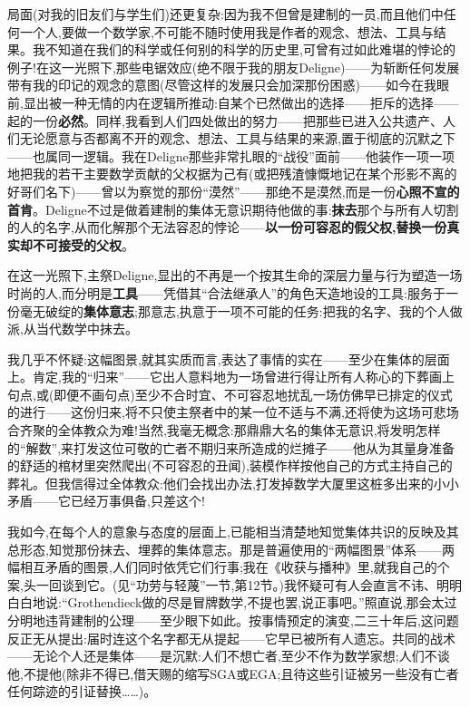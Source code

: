 \dmark{}局面(对我的旧友们与学生们)还更复杂:因为我不但曾是建制的一员,而且他们中任何一个人,要做一个数学家,不可能不随时使用我是作者的观念、想法、工具与结果。我不知道在我们的科学或任何别的科学的历史里,可曾有过如此难堪的悖论的例子!在这一光照下,那些电锯效应(绝不限于我的朋友Deligne)——为斩断任何发展带有我的印记的观念的意图(尽管这样的发展只会加深那份困惑)——如今在我眼前,显出被一种无情的内在逻辑所推动:自某个已然做出的选择——拒斥的选择——起的一份\textbf{必然}。同样,我看到人们四处做出的努力——把那些已进入公共遗产、人们无论愿意与否都离不开的观念、想法、工具与结果的来源,置于彻底的沉默之下——也属同一逻辑。我在Deligne那些非常扎眼的“战役”面前——他装作一项一项地把我的若干主要数学贡献的父权据为己有(或把残渣慷慨地记在某个形影不离的好哥们名下)——曾以为察觉的那份“漠然”——那绝不是漠然,而是一份\textbf{心照不宣的首肯}。Deligne不过是做着建制的集体无意识期待他做的事:\textbf{抹去}那个与所有人切割的人的名字,从而化解那个无法容忍的悖论——\textbf{以一份可容忍的假父权,替换一份真实却不可接受的父权}。

在这一光照下,主祭Deligne,显出的不再是一个按其生命的深层力量与行为塑造一场时尚的人,而分明是\textbf{工具}——凭借其“合法继承人”的角色天造地设的工具:服务于一份毫无破绽的\textbf{集体意志};那意志,执意于一项不可能的任务:把我的名字、我的个人做派,从当代数学中抹去。

我几乎不怀疑:这幅图景,就其实质而言,表达了事情的实在——至少在集体的层面上。肯定,我的“归来”——它出人意料地为一场曾进行得让所有人称心的下葬画上句点,或(即便不画句点)至少不合时宜、不可容忍地扰乱一场仿佛早已排定的仪式的进行——这份归来,将不只使主祭者中的某一位不适与不满,还将使为这场可悲场合齐聚的全体教众为难!当然,我毫无概念:那鼎鼎大名的集体无意识,将发明怎样的“解数”,来打发这位可敬的亡者不期归来所造成的烂摊子——他从为其量身准备的舒适的棺材里突然爬出(不可容忍的丑闻),装模作样按他自己的方式主持自己的葬礼。但我信得过全体教众:他们会找出办法,打发掉数学大厦里这桩多出来的小小矛盾——它已经万事俱备,只差这个!

我如今,在每个人的意象与态度的层面上,已能相当清楚地知觉集体共识的反映及其总形态,知觉那份抹去、埋葬的集体意志。那是普遍使用的“两幅图景”体系——两幅相互矛盾的图景,人们同时依凭它们行事;我在《收获与播种》里,就我自己的个案,头一回谈到它。(见“功劳与轻蔑”一节,第12节。)我怀疑可有人会直言不讳、明明白白地说:“Grothendieck做的尽是冒牌数学,不提也罢,说正事吧。”照直说,那会太过分明地违背建制的公理——至少眼下如此。按事情预定的演变,二三十年后,这问题反正无从提出:届时连这个名字都无从提起——它早已被所有人遗忘。共同的战术——无论个人还是集体——是沉默:人们不想亡者,至少不作为数学家想;人们不谈他,不提他(除非不得已,借天赐的缩写SGA或EGA;且待这些引证被另一些没有亡者任何踪迹的引证替换……)。

